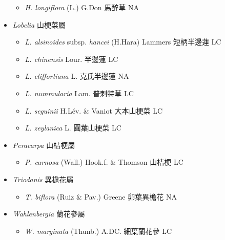 \begin{itemize}
  \begin{itemize}
        \item[] \textit{H. longiflora} (L.) G.Don  馬醉草   NA
  \end{itemize}
 \item[] \textit{Lobelia} 山梗菜屬
                                
  \begin{itemize}
        \item[] \textit{L. alsinoides} subsp. \textit{hancei} (H.Hara) Lammers  短柄半邊蓮   LC
        \item[] \textit{L. chinensis} Lour.  半邊蓮   LC
        \item[] \textit{L. cliffortiana} L.  克氏半邊蓮   NA
        \item[] \textit{L. nummularia} Lam.  普剌特草   LC
        \item[] \textit{L. seguinii} H.Lév. \& Vaniot  大本山梗菜   LC
        \item[] \textit{L. zeylanica} L.  圓葉山梗菜   LC
  \end{itemize}
 \item[] \textit{Peracarpa} 山桔梗屬
                                
  \begin{itemize}
        \item[] \textit{P. carnosa} (Wall.) Hook.f. \& Thomson  山桔梗   LC
  \end{itemize}
 \item[] \textit{Triodanis} 異檐花屬
                                
  \begin{itemize}
        \item[] \textit{T. biflora} (Ruiz \& Pav.) Greene  卵葉異檐花   NA
  \end{itemize}
 \item[] \textit{Wahlenbergia} 蘭花參屬
                                
  \begin{itemize}
        \item[] \textit{W. marginata} (Thunb.) A.DC.  細葉蘭花參   LC
  \end{itemize}
  \end{itemize}
